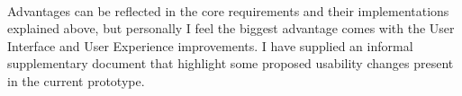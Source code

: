 \paragraph{}
Advantages can be reflected in the core requirements and their implementations explained above, but personally I feel the biggest
advantage comes with the User Interface and User Experience improvements.
I have supplied an informal supplementary document that highlight some proposed usability changes present in the current prototype.

\clearpage
\printglossaries